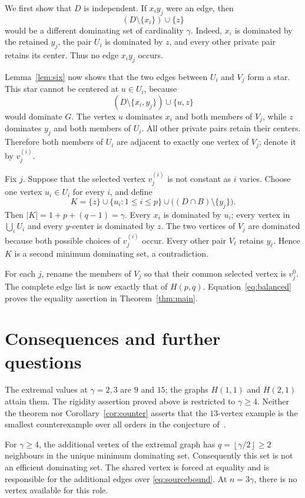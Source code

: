 \documentclass[11pt]{article}
\theoremstyle{definition}
\theoremstyle{remark}
\newcommand{\floor}[1]{\left\lfloor#1\right\rfloor}
\begin{document}
We first show that $D$ is independent. If $x_iy_j$ were an edge, then
\[
 (D\setminus\{x_i\})\cup\{z\}
\]
would be a different dominating set of cardinality $\gamma$.
Indeed, $x_i$ is dominated by the retained $y_j$, the pair $U_i$ is
dominated by $z$, and every other private pair retains its center.
Thus no edge $x_iy_j$ occurs.

Lemma~\ref{lem:six} now shows that the two edges between $U_i$ and $V_j$
form a star. This star cannot be centered at $u\in U_i$, because
\[
 (D\setminus\{x_i,y_j\})\cup\{u,z\}
\]
would dominate $G$. The vertex $u$ dominates $x_i$ and both members of
$V_j$, while $z$ dominates $y_j$ and both members of $U_i$.
All other private pairs retain their centers. Therefore both members of
$U_i$ are adjacent to exactly one vertex of $V_j$; denote it by $v_j^{(i)}$.

Fix $j$. Suppose that the selected vertex $v_j^{(i)}$ is not constant as
$i$ varies. Choose one vertex $u_i\in U_i$ for every $i$, and define
\[
 K=\{z\}\cup\{u_i:1\le i\le p\}
       \cup\bigl((D\cap B)\setminus\{y_j\}\bigr).
\]
Then $|K|=1+p+(q-1)=\gamma$. Every $x_i$ is dominated by $u_i$;
every vertex in $\bigcup_iU_i$ and every $y$-center is dominated by $z$.
The two vertices of $V_j$ are dominated because both possible choices of
$v_j^{(i)}$ occur. Every other pair $V_\ell$ retains $y_\ell$.
Hence $K$ is a second minimum dominating set, a contradiction.

For each $j$, rename the members of $V_j$ so that their common selected
vertex is $v_j^0$. The complete edge list is now exactly that of $H(p,q)$.
Equation~\eqref{eq:balanced} proves the equality assertion in
Theorem~\ref{thm:main}.

\section{Consequences and further questions}

The extremal values at $\gamma=2,3$ are $9$ and $15$; the graphs
$H(1,1)$ and $H(2,1)$ attain them. The rigidity assertion proved above is
restricted to $\gamma\ge4$. Neither the theorem nor Corollary~\ref{cor:counter}
asserts that the $13$-vertex example is the smallest counterexample over all
orders in the conjecture of~\cite{KN}.

For $\gamma\ge4$, the additional vertex of the extremal graph has
$q=\floor{\gamma/2}\ge2$ neighbours in the unique minimum dominating set.
Consequently this set is not an efficient dominating set. The shared vertex
is forced at equality and is responsible for the additional edges over
\eqref{eq:sourcebound}. At $n=3\gamma$, there is no vertex available for this
role.
\end{document}
